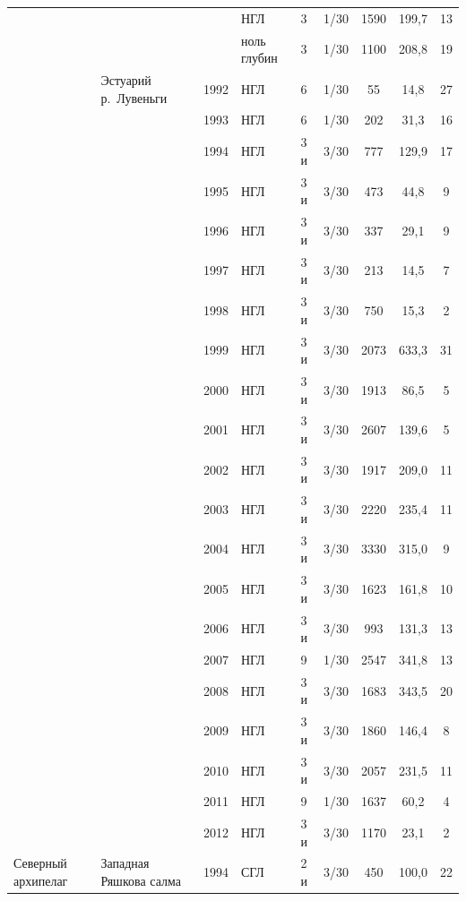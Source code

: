\documentclass[12pt, a4paper]{disser}
\begin{document}
\begin{footnotesize}
\begin{longtable}{|p{2cm}|p{3cm}|p{1cm}|p{2cm}|p{1.5cm}|p{1cm}|*{3}{c|}}
		\\ \cline{4-9}
		 &  &  & НГЛ & 3 & 1/30 & 1590 & 199,7 & 13
		\\ \cline{4-9}
		 &  &  & ноль глубин & 3 & 1/30 & 1100 & 208,8 & 19
		\\ \cline{2-9}
	 & Эстуарий р.~Лувень\-ги & 1992 & НГЛ & 6 & 1/30 & 55 & 14,8 & 27
		\\ \cline{3-9}
		 &  & 1993 & НГЛ & 6 & 1/30 & 202 & 31,3 & 16
		\\ \cline{3-9}
		 &  & 1994 & НГЛ & 3 и & 3/30 & 777 & 129,9 & 17
		\\ \cline{3-9}
		 &  & 1995 & НГЛ & 3 и & 3/30 & 473 & 44,8 & 9
		\\ \cline{3-9}
		 &  & 1996 & НГЛ & 3 и & 3/30 & 337 & 29,1 & 9
		\\ \cline{3-9}
		 &  & 1997 & НГЛ & 3 и & 3/30 & 213 & 14,5 & 7
		\\ \cline{3-9}
		 &  & 1998 & НГЛ & 3 и & 3/30 & 750 & 15,3 & 2
		\\ \cline{3-9}
		 &  & 1999 & НГЛ & 3 и & 3/30 & 2073 & 633,3 & 31
		\\ \cline{3-9}
		 &  & 2000 & НГЛ & 3 и & 3/30 & 1913 & 86,5 & 5
		\\ \cline{3-9}
		 &  & 2001 & НГЛ & 3 и & 3/30 & 2607 & 139,6 & 5
		\\ \cline{3-9}
		 &  & 2002 & НГЛ & 3 и & 3/30 & 1917 & 209,0 & 11
		\\ \cline{3-9}
		 &  & 2003 & НГЛ & 3 и & 3/30 & 2220 & 235,4 & 11
		\\ \cline{3-9}
		 &  & 2004 & НГЛ & 3 и & 3/30 & 3330 & 315,0 & 9
		\\ \cline{3-9}
		 &  & 2005 & НГЛ & 3 и & 3/30 & 1623 & 161,8 & 10
		\\ \cline{3-9}
		 &  & 2006 & НГЛ & 3 и & 3/30 & 993 & 131,3 & 13
		\\ \cline{3-9}
		 &  & 2007 & НГЛ & 9 & 1/30 & 2547 & 341,8 & 13
		\\ \cline{3-9}
		 &  & 2008 & НГЛ & 3 и & 3/30 & 1683 & 343,5 & 20
		\\ \cline{3-9}
		 &  & 2009 & НГЛ & 3 и & 3/30 & 1860 & 146,4 & 8
		\\ \cline{3-9}
		 &  & 2010 & НГЛ & 3 и & 3/30 & 2057 & 231,5 & 11
		\\ \cline{3-9}
		 &  & 2011 & НГЛ & 9 & 1/30 & 1637 & 60,2 & 4
		\\ \cline{3-9}
		 &  & 2012 & НГЛ & 3 и & 3/30 & 1170 & 23,1 & 2
		\\ \hline
	Северный архипелаг & Западная Ряшкова салма & 1994 & СГЛ & 2 и & 3/30 & 450 & 100,0 & 22

\end{longtable}
\end{footnotesize}
\end{document}
